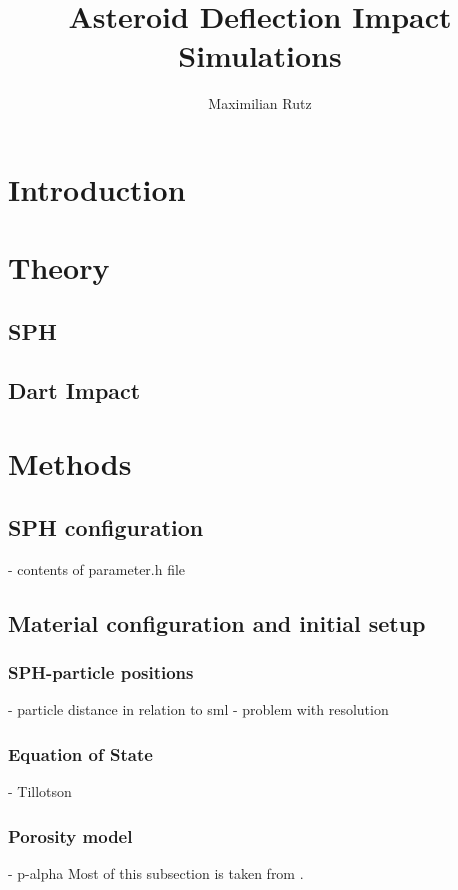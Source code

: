 \documentclass{article}
\title{Asteroid Deflection Impact Simulations}
\author{Maximilian Rutz}
\date{}
\begin{document}
	\maketitle
	\begin{abstract}

	\end{abstract}

	\newpage
	\tableofcontents

	\newpage
	\section{Introduction}
	\section{Theory}
		\subsection{SPH}
		\subsection{Dart Impact}
	\section{Methods}
		\subsection{SPH configuration}
		- contents of parameter.h file
		\subsection{Material configuration and initial setup}
			\subsubsection{SPH-particle positions}
			- particle distance in relation to sml
			- problem with resolution
			\subsubsection{Equation of State}
			- Tillotson
			\subsubsection{Porosity model}
			- p-alpha
			Most of this subsection is taken from \cite{Jutzi_p_alpha_1}.
\end{document}
